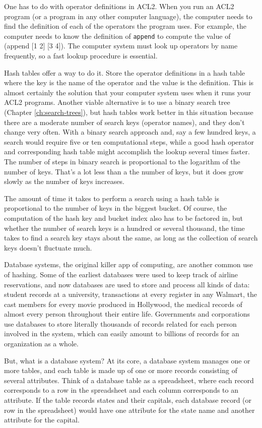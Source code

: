 One has to do with operator definitions in ACL2. When
you run an ACL2 program (or a program in any other computer language),
the computer needs to find the definition of each of the operators
the program uses.
For example, the computer needs to know the definition of
\texttt{append} to compute the value of (append [1 2] [3  4]).
The computer system must look up operators by name frequently,
so a fast lookup procedure is essential.

Hash tables offer a way to do it. Store the operator
definitions in a hash table where the key is the name of the operator
and the value is the definition. This is almost certainly the solution
that your computer system uses when it runs your ACL2 programs.
Another viable alternative is to use a binary search tree
(Chapter \ref{ch:search-trees}), but hash tables work better
in this situation because there are a moderate number of search keys
(operator names), and they don't change very often.
With a binary search approach and, say a few hundred keys,
a search would require five or ten computational steps,
while a good hash operator and corresponding hash table
might accomplish the lookup several times faster.
The number of steps in binary search is proportional to the
logarithm of the number of keys. That's a lot less than a the
number of keys, but it does grow slowly as the number of keys increases.

The amount of time it takes to perform a search using a hash table
is proportional to the number of keys in the biggest bucket.
Of course, the computation of the hash key and bucket index
also has to be factored in, but whether the number of search keys
is a hundred or several thousand, the time takes to find a search
key stays about the same, as long as the collection of search
keys doesn't fluctuate much.

Database systems, the original killer app of
computing, are another common use of hashing.
Some of the earliest databases were used to keep track
of airline reservations, and now databases are used to store and
process all kinds of data: student records at a university,
transactions at every register in any Walmart, the
cast members for every movie produced in Hollywood,
the medical records of almost every person throughout their entire life.
Governments and corporations use databases to store literally
thousands of records related for each person involved in the system,
which can easily amount to billions
of records for an organization as a whole.

But, what is a database system? At its core, a database system
manages one or more tables, and each table is made up of one or more
records consisting of several attributes.
Think of a database table as a
spreadsheet, where each record corresponds to a row in the spreadsheet
and each column corresponds to an attribute. If the table
records states and their capitals, each database
record (or row in the spreadsheet) would have one attribute for the
state name and another attribute for the capital.

